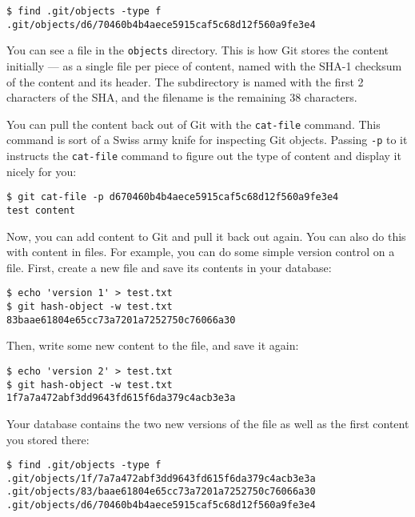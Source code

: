 \documentclass[a4paper]{book}
\newcounter{tab}[chapter]
\begin{document}
\begin{shaded}\begin{verbatim}
$ find .git/objects -type f
.git/objects/d6/70460b4b4aece5915caf5c68d12f560a9fe3e4
\end{verbatim}\end{shaded}

You can see a file in the \texttt{objects} directory. This is how Git stores the content initially --- as a single file per piece of content, named with the SHA-1 checksum of the content and its header. The subdirectory is named with the first 2 characters of the SHA, and the filename is the remaining 38 characters.

You can pull the content back out of Git with the \texttt{cat-file} command. This command is sort of a Swiss army knife for inspecting Git objects. Passing \texttt{-p} to it instructs the \texttt{cat-file} command to figure out the type of content and display it nicely for you:

\begin{shaded}\begin{verbatim}
$ git cat-file -p d670460b4b4aece5915caf5c68d12f560a9fe3e4
test content
\end{verbatim}\end{shaded}

Now, you can add content to Git and pull it back out again. You can also do this with content in files. For example, you can do some simple version control on a file. First, create a new file and save its contents in your database:

\begin{shaded}\begin{verbatim}
$ echo 'version 1' > test.txt
$ git hash-object -w test.txt
83baae61804e65cc73a7201a7252750c76066a30
\end{verbatim}\end{shaded}

Then, write some new content to the file, and save it again:

\begin{shaded}\begin{verbatim}
$ echo 'version 2' > test.txt
$ git hash-object -w test.txt
1f7a7a472abf3dd9643fd615f6da379c4acb3e3a
\end{verbatim}\end{shaded}

Your database contains the two new versions of the file as well as the first content you stored there:

\begin{shaded}\begin{verbatim}
$ find .git/objects -type f
.git/objects/1f/7a7a472abf3dd9643fd615f6da379c4acb3e3a
.git/objects/83/baae61804e65cc73a7201a7252750c76066a30
.git/objects/d6/70460b4b4aece5915caf5c68d12f560a9fe3e4
\end{verbatim}\end{shaded}
\end{document}

